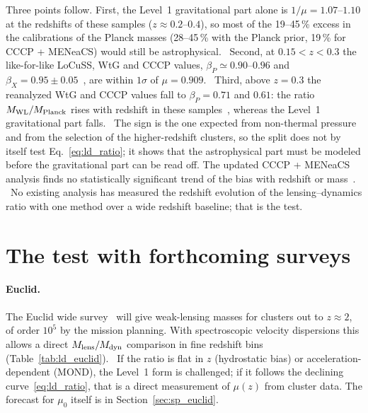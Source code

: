 Three points follow. First, the Level~1 gravitational part alone is $1/\mu=1.07$--$1.10$ at the redshifts of these samples ($z\approx0.2$--$0.4$),
so most of the 19--45\,\% excess in the calibrations of the Planck masses (28--45\,\% with the Planck prior, 19\,\% for CCCP + MENeaCS) would still be astrophysical. \calc\ Second, at $0.15<z<0.3$ the like-for-like
LoCuSS, WtG and CCCP values, $\beta_P\simeq0.90$--$0.96$ and $\beta_X=0.95\pm0.05$~\cite{Smith2016LoCuSS}, are within $1\sigma$ of $\mu=0.909$. \calc\
Third, above $z=0.3$ the reanalyzed WtG and CCCP values fall to $\beta_P=0.71$ and $0.61$: the ratio $M_{\rm WL}/M_{\rm Planck}$ rises with redshift
in these samples~\cite{Smith2016LoCuSS}, whereas the Level~1 gravitational part falls. \observed\ The sign is the one expected from non-thermal pressure
and from the selection of the higher-redshift clusters, so the split does not by itself test Eq.~\eqref{eq:ld_ratio}; it shows that the astrophysical
part must be modeled before the gravitational part can be read off. The updated CCCP + MENeaCS analysis finds no statistically significant trend of
the bias with redshift or mass~\cite{Herbonnet2020}. \observed\ No existing analysis has measured the redshift evolution of the lensing--dynamics ratio
with one method over a wide redshift baseline; that is the test. \openprob

\section{The test with forthcoming surveys}\label{sec:ld_surveys}
\paragraph{Euclid.} The Euclid wide survey~\cite{Scaramella2022} will give weak-lensing masses for clusters out to $z\approx2$, of order $10^5$ by the
mission planning. With spectroscopic velocity dispersions this allows a direct $M_{\rm lens}/M_{\rm dyn}$ comparison in fine redshift bins
(Table~\ref{tab:ld_euclid}). \prediction\ If the ratio is flat in $z$ (hydrostatic bias) or acceleration-dependent (MOND), the Level~1 form is
challenged; if it follows the declining curve~\eqref{eq:ld_ratio}, that is a direct measurement of $\mu(z)$ from cluster data. The forecast for
$\mu_0$ itself is in Section~\ref{sec:sp_euclid}.

